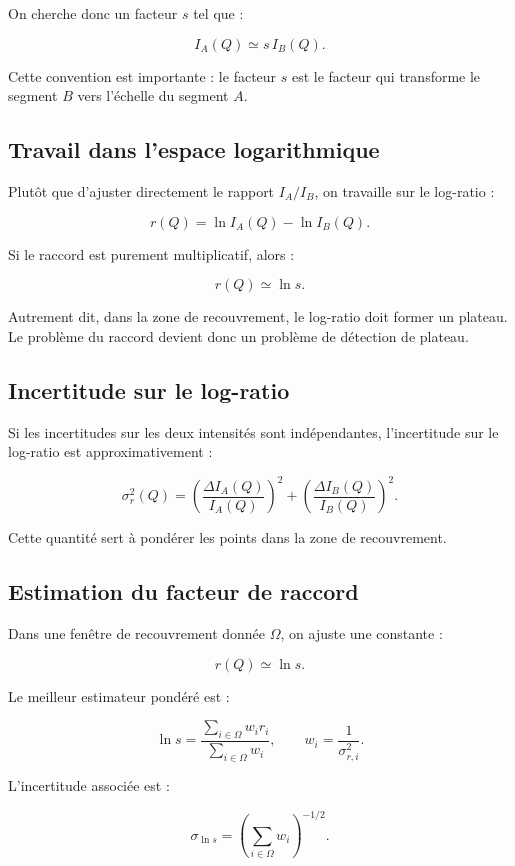 \documentclass[11pt,a4paper]{article}
\begin{document}
On cherche donc un facteur $s$ tel que :

\[
    I_A(Q) \simeq s\,I_B(Q).
\]

Cette convention est importante : le facteur $s$ est le facteur qui transforme
le segment $B$ vers l'échelle du segment $A$.

\subsection{Travail dans l'espace logarithmique}

Plutôt que d'ajuster directement le rapport $I_A/I_B$, on travaille sur le
log-ratio :

\[
    r(Q) = \ln I_A(Q) - \ln I_B(Q).
\]

Si le raccord est purement multiplicatif, alors :

\[
    r(Q) \simeq \ln s.
\]

Autrement dit, dans la zone de recouvrement, le log-ratio doit former un
plateau. Le problème du raccord devient donc un problème de détection de plateau.

\subsection{Incertitude sur le log-ratio}

Si les incertitudes sur les deux intensités sont indépendantes, l'incertitude
sur le log-ratio est approximativement :

\[
    \sigma_r^2(Q)
    =
    \left(\frac{\Delta I_A(Q)}{I_A(Q)}\right)^2
    +
    \left(\frac{\Delta I_B(Q)}{I_B(Q)}\right)^2.
\]

Cette quantité sert à pondérer les points dans la zone de recouvrement.

\subsection{Estimation du facteur de raccord}

Dans une fenêtre de recouvrement donnée $\Omega$, on ajuste une constante :

\[
    r(Q) \simeq \ln s.
\]

Le meilleur estimateur pondéré est :

\[
    \ln s =
    \frac{\sum_{i\in\Omega} w_i r_i}
         {\sum_{i\in\Omega} w_i},
    \qquad
    w_i = \frac{1}{\sigma_{r,i}^2}.
\]

L'incertitude associée est :

\[
    \sigma_{\ln s}
    =
    \left(
        \sum_{i\in\Omega} w_i
    \right)^{-1/2}.
\]
\end{document}
